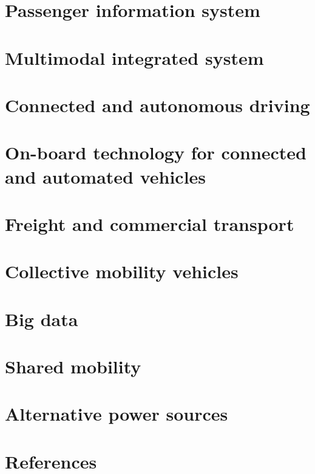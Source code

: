 \documentclass[
]{book}
\begin{document}
\hypertarget{passenger}{%
\chapter{Passenger information system}\label{passenger}}

\hypertarget{multimodal}{%
\chapter{Multimodal integrated system}\label{multimodal}}

\hypertarget{connected}{%
\chapter{Connected and autonomous driving}\label{connected}}

\hypertarget{onboard}{%
\chapter{On-board technology for connected and automated vehicles}\label{onboard}}

\hypertarget{freight}{%
\chapter{Freight and commercial transport}\label{freight}}

\hypertarget{collective}{%
\chapter{Collective mobility vehicles}\label{collective}}

\hypertarget{big}{%
\chapter{Big data}\label{big}}

\hypertarget{shared}{%
\chapter{Shared mobility}\label{shared}}

\hypertarget{alternative}{%
\chapter{Alternative power sources}\label{alternative}}

\hypertarget{reference}{%
\chapter{References}\label{reference}}

  
\end{document}
